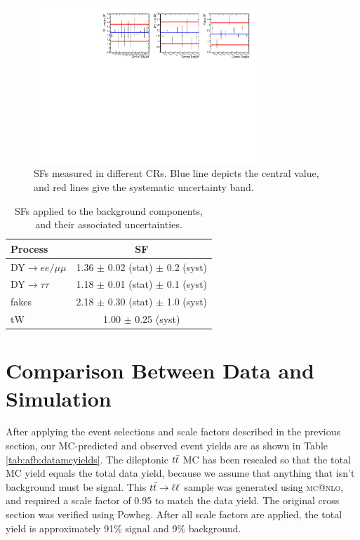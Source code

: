 \begin{figure}[t]
  \centering
  \includegraphics[width=0.75\textwidth]{figures/SFs_all.pdf}
  \caption{SFs measured in different CRs. Blue line depicts the
    central value, and red lines give the systematic uncertainty band.}
  \label{fig:afb:sfvariations}
\end{figure}

\begin{table}[h]
\begin{center}
\caption{SFs applied to the background components, and their
  associated uncertainties.}
\label{tab:afb:sfs}
{\small
\begin{tabular}{l|c}
\hline
Process & SF  \\
\hline
DY$\rightarrow ee/\mu\mu$ & 1.36 $\pm$ 0.02 (stat) $\pm$ 0.2 (syst) \\
DY$\rightarrow\tau\tau$   & 1.18 $\pm$ 0.01 (stat) $\pm$ 0.1 (syst) \\
fakes             & 2.18 $\pm$ 0.30 (stat) $\pm$ 1.0 (syst) \\
tW                & 1.00 $\pm$ 0.25 (syst) \\
\hline
\end{tabular}
}
\end{center}
\end{table}

\section{Comparison Between Data and Simulation}
\label{sec:afb:datamccompare}

After applying the event selections and scale factors described in the
previous section, our MC-predicted and observed event yields are as
shown in Table \ref{tab:afb:datamcyields}. The dileptonic $t\bar{t}$
MC has been rescaled so that the total MC yield equals the total data
yield, because we assume that anything that isn't background must be
signal. This $t\bar{t} \rightarrow \ell\ell$ sample was generated using \textsc{mc@nlo}, and
required a scale factor of 0.95 to match the data yield. The original
cross section was verified using Powheg. After all scale factors are applied, the
total yield is approximately 91\% signal and 9\% background.

